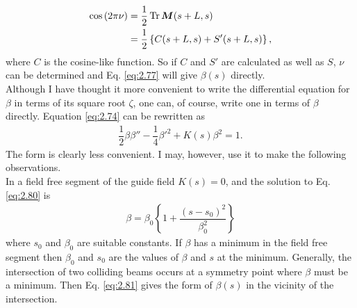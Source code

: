 \begin{align}
	\cos{(2\pi\nu)} &= \dfrac{1}{2}\operatorname{Tr}\bm{M}(s+L,s) \\
    	&= \dfrac{1}{2}\left\lbrace C(s+L,s)+S'(s+L,s) \right\rbrace,
\end{align}
where $C$ is the cosine-like function. So if $C$ and $S'$ are calculated as well as $S$, $\nu$ can be determined and Eq. \eqref{eq:2.77} will give $\beta(s)$ directly.\\
Although I have thought it more convenient to write the differential equation for $\beta$ in terms of its square root $\zeta$, one can, of course, write one in terms of $\beta$ directly. Equation \eqref{eq:2.74} can be rewritten as
\begin{align}\label{eq:2.80}
	\dfrac{1}{2}\beta\beta'' - \dfrac{1}{4}\beta'^2 + K(s)\beta^2 = 1.
\end{align}
The form is clearly less convenient. I may, however, use it to make the following observations.\\
In a field free segment of the guide field $K(s) = 0$, and the solution to Eq. \eqref{eq:2.80} is
\begin{align}\label{eq:2.81}
	\beta = \beta_0 \left\lbrace 1 + \dfrac{(s-s_0)^2}{\beta_0^2} \right\rbrace
\end{align}
where $s_0$ and $\beta_0$ are suitable constants. If $\beta$ has a minimum in the field free segment then $\beta_0$ and $s_0$ are the values of $\beta$ and $s$ at the minimum. Generally, the
intersection of two colliding beams occurs at a symmetry point where $\beta$ must be a minimum. Then Eq. \eqref{eq:2.81} gives the form of $\beta(s)$ in the vicinity of the intersection.


